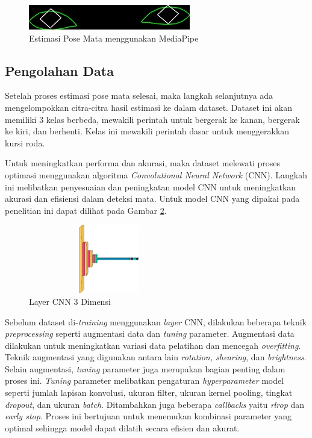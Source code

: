 \begin{figure} [ht] \centering
  \includegraphics[scale=0.55]{gambar/bab4/30.jpg}
  \caption{Estimasi Pose Mata menggunakan MediaPipe}
  \label{fig:estimasi}
\end{figure}

\subsection{Pengolahan Data}

Setelah proses estimasi pose mata selesai, maka langkah selanjutnya ada mengelompokkan citra-citra hasil estimasi ke dalam dataset. Dataset ini akan memiliki 3 kelas berbeda, mewakili perintah untuk bergerak ke kanan, bergerak ke kiri, dan berhenti. Kelas ini mewakili perintah dasar untuk menggerakkan kursi roda. 

Untuk meningkatkan performa dan akurasi, maka dataset melewati proses optimasi menggunakan algoritma \emph{Convolutional Neural Network} (CNN). Langkah ini melibatkan penyesuaian dan peningkatan model CNN untuk meningkatkan akurasi dan efisiensi dalam deteksi mata. Untuk model CNN yang dipakai pada penelitian ini dapat dilihat pada Gambar \ref{fig:3dlayer}.

\begin{figure} [ht] \centering
  \includegraphics[height=2.99cm ,width=7cm]{gambar/bab3/3dlayer.png}
  \caption{Layer CNN 3 Dimensi}
  \label{fig:3dlayer}
\end{figure}

Sebelum dataset di-\emph{training} menggunakan \emph{layer} CNN, dilakukan beberapa teknik \emph{preprocessing} seperti augmentasi data dan \emph{tuning} parameter. Augmentasi data dilakukan untuk meningkatkan variasi data pelatihan dan mencegah \emph{overfitting}. Teknik augmentasi yang digunakan antara lain \emph{rotation, shearing}, dan \emph{brightness}. Selain augmentasi, \emph{tuning} parameter juga merupakan bagian penting dalam proses ini. \emph{Tuning} parameter melibatkan pengaturan \emph{hyperparameter} model seperti jumlah lapisan konvolusi, ukuran filter, ukuran kernel pooling, tingkat \emph{dropout}, dan ukuran \emph{batch}. Ditambahkan juga beberapa \emph{callbacks} yaitu \emph{rlrop} dan \emph{early stop}. Proses ini bertujuan untuk menemukan kombinasi parameter yang optimal sehingga model dapat dilatih secara efisien dan akurat.

